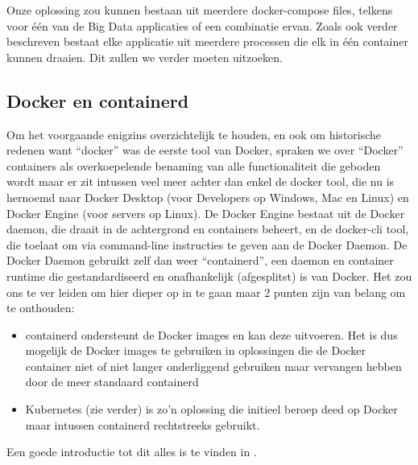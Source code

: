 Onze oplossing zou kunnen bestaan uit meerdere docker-compose files, telkens voor één van de Big Data applicaties of een combinatie ervan. Zoals ook verder beschreven bestaat elke applicatie uit meerdere processen die elk in één container kunnen draaien. Dit zullen we verder moeten uitzoeken.
\newline
\newline

\subsection{Docker en containerd}
Om het voorgaande enigzins overzichtelijk te houden, en ook om historische redenen want ``docker'' was de eerste tool van Docker, spraken we over ``Docker'' containers als overkoepelende benaming van alle functionaliteit die geboden wordt maar er zit intussen veel meer achter dan enkel de docker tool, die nu is hernoemd naar Docker Desktop (voor Developers op Windows, Mac en Linux) en Docker Engine (voor servers op Linux).
De Docker Engine bestaat uit de Docker daemon, die draait in de achtergrond en containers beheert, en de docker-cli tool, die toelaat om via command-line instructies te geven aan de Docker Daemon.
De Docker Daemon gebruikt zelf dan weer ``containerd'', een daemon en container runtime die gestandardiseerd en onafhankelijk (afgesplitst) is van Docker. Het zou ons te ver leiden om hier dieper op in te gaan maar 2 punten zijn van belang om te onthouden:
\begin{itemize}
    \item containerd ondersteunt de Docker images en kan deze uitvoeren. Het is dus mogelijk de Docker images te gebruiken in oplossingen die de Docker container niet of niet langer onderliggend gebruiken maar vervangen hebben door de meer standaard containerd
    \item Kubernetes (zie verder) is zo'n oplossing die initieel beroep deed op Docker maar intussen containerd rechtstreeks gebruikt.
\end{itemize}

Een goede introductie tot dit alles is te vinden in \textcite{Donohue2023}.


